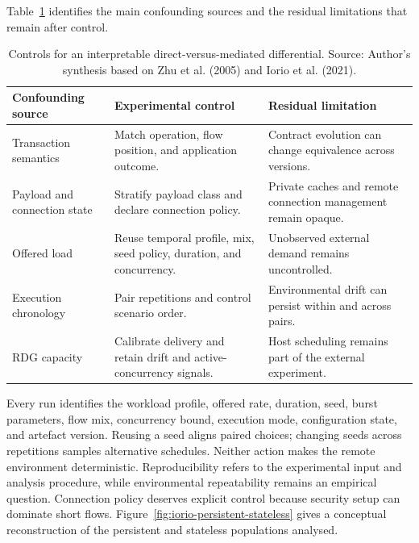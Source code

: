 \noindent Table~\ref{tab:differential-controls} identifies the main confounding sources and
the residual limitations that remain after control.

\begingroup
\renewcommand{\arraystretch}{1.0}
\begin{table}[H]
    \centering
    \caption[Controls for the direct-versus-mediated differential]{Controls for
    an interpretable direct-versus-mediated differential. Source: Author's synthesis based on Zhu et al. (2005) and Iorio et al. (2021).}
    \label{tab:differential-controls}
    \small
    \begin{tabular}{|>{\raggedright\arraybackslash}p{2.8cm}|>{\raggedright\arraybackslash}p{4.2cm}|>{\raggedright\arraybackslash}p{4.6cm}|}
    \hline
    \rowcolor{veryPeri!18}
    \textbf{Confounding source} & \textbf{Experimental control} & \textbf{Residual limitation} \\
    \hline
    \rowcolor{tableGray}
    Transaction semantics & Match operation, flow position, and application outcome. & Contract evolution can change equivalence across versions. \\
    \hline
    Payload and connection state & Stratify payload class and declare connection policy. & Private caches and remote connection management remain opaque. \\
    \hline
    \rowcolor{tableGray}
    Offered load & Reuse temporal profile, mix, seed policy, duration, and concurrency. & Unobserved external demand remains uncontrolled. \\
    \hline
    Execution chronology & Pair repetitions and control scenario order. & Environmental drift can persist within and across pairs. \\
    \hline
    \rowcolor{tableGray}
    RDG capacity & Calibrate delivery and retain drift and active-concurrency signals. & Host scheduling remains part of the external experiment. \\
    \hline
\end{tabular}
\end{table}
\endgroup

\noindent Every run identifies the workload profile, offered rate, duration,
seed, burst parameters, flow mix, concurrency bound, execution mode,
configuration state, and artefact version. Reusing a seed aligns paired choices;
changing seeds across repetitions samples alternative schedules. Neither action
makes the remote environment deterministic. Reproducibility refers to the
experimental input and analysis procedure, while environmental repeatability
remains an empirical question. Connection policy deserves explicit control because security setup can
dominate short flows. Figure~\ref{fig:iorio-persistent-stateless} gives a
conceptual reconstruction of the persistent and stateless populations analysed.

